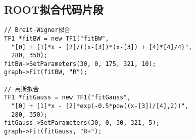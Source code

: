 \documentclass{thuemp}
\begin{document}
\subsection{ROOT拟合代码片段}
\begin{verbatim}
// Breit-Wigner拟合
TF1 *fitBW = new TF1("fitBW", 
  "[0] + [1]*x - [2]/((x-[3])*(x-[3]) + [4]*[4]/4)", 
  280, 350);
fitBW->SetParameters(30, 0, 175, 321, 10);
graph->Fit(fitBW, "R");

// 高斯拟合
TF1 *fitGauss = new TF1("fitGauss", 
  "[0] + [1]*x - [2]*exp(-0.5*pow((x-[3])/[4],2))", 
  280, 350);
fitGauss->SetParameters(30, 0, 30, 321, 5);
graph->Fit(fitGauss, "R+");
\end{verbatim}
\end{document}
